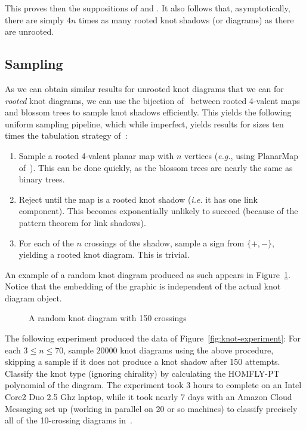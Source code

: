 \documentclass[submission%
]{dmtcs}
\begin{document}
This proves then the suppositions of
\cite{pzjschaeff2004planecurveasymp} and \cite{zuber2015mapsimsperms}.
It also follows that, asymptotically, there are simply $4n$ times as
many rooted knot shadows (or diagrams) as there are unrooted.

\subsection{Sampling}
\label{sec:sampling}

As we can obtain similar results for unrooted knot diagrams that we
can for \emph{rooted} knot diagrams, we can use the bijection
of~\cite{Schaeffer1997} between rooted 4-valent maps and blossom trees
to sample knot shadows efficiently. This yields the following uniform
sampling pipeline, which while imperfect, yields results for sizes ten
times the tabulation strategy of~\cite{CCMknotdiagrams2015}:

\begin{enumerate}
\item Sample a rooted 4-valent planar map with $n$ vertices
  (\textit{e.g.}, using PlanarMap of~\cite{SchaefferPlanarMap}). This can be
  done quickly, as the blossom trees are nearly the same as binary
  trees.
\item Reject until the map is a rooted knot shadow (\textit{i.e.} it
  has one link component). This becomes exponentially unlikely to
  succeed (because of the pattern theorem for link shadows).
\item For each of the $n$ crossings of the shadow, sample a sign from
  $\{+, -\}$, yielding a rooted knot diagram. This is trivial.
\end{enumerate}

An example of a random knot diagram produced as such appears in
Figure~\ref{fig:randomknot}. Notice that the embedding of the graphic
is independent of the actual knot diagram object.
\begin{figure}[htbp]
  \centering
  
  \caption{A random knot diagram with 150 crossings}
  \label{fig:randomknot}
\end{figure}

The following experiment produced the data of
Figure~\ref{fig:knot-experiment}: For each $3 \le n \le 70$, sample
$20000$ knot diagrams using the above procedure, skipping a sample if
it does not produce a knot shadow after 150 attempts. Classify the
knot type (ignoring chirality) by calculating the HOMFLY-PT polynomial
of the diagram. The experiment took 3 hours to complete on an Intel
Core2 Duo 2.5 Ghz laptop, while it took nearly 7 days with an Amazon
Cloud Messaging set up (working in parallel on 20 or so machines) to
classify precisely all of the 10-crossing diagrams
in~\cite{CCMknotdiagrams2015}.
\end{document}

